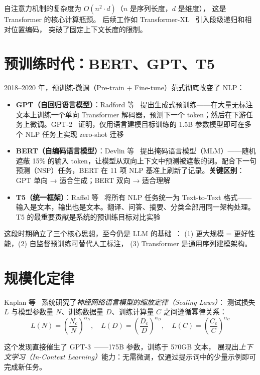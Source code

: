\documentclass[10pt, openany]{book}
\begin{document}
自注意力机制的复杂度为 \(O(n^2 \cdot d)\)（\(n\) 是序列长度，\(d\) 是维度），
这是 Transformer 的核心计算瓶颈。
后续工作如 Transformer-XL~\cite{Dai2019TransformerXL} 引入段级递归和相对位置编码，
突破了固定上下文长度的限制。

\section{预训练时代：BERT、GPT、T5}

2018--2020 年，预训练-微调（Pre-train + Fine-tune）范式彻底改变了 NLP：

\begin{itemize}
    \item \textbf{GPT（自回归语言模型）}：Radford 等~\cite{Radford2018GPT} 提出生成式预训练——在大量无标注文本上训练一个单向 Transformer 解码器，预测下一个 token；然后在下游任务上微调。GPT-2~\cite{Radford2019GPT2} 证明，仅用语言建模目标训练的 1.5B 参数模型即可在多个 NLP 任务上实现 zero-shot 迁移
    \item \textbf{BERT（自编码语言模型）}：Devlin 等~\cite{Devlin2019BERT} 提出掩码语言模型（MLM）——随机遮蔽 15\% 的输入 token，让模型从双向上下文中预测被遮蔽的词。配合下一句预测（NSP）任务，BERT 在 11 项 NLP 基准上刷新了记录。\textbf{关键区别}：GPT 单向 → 适合生成；BERT 双向 → 适合理解
    \item \textbf{T5（统一框架）}：Raffel 等~\cite{Raffel2020T5} 将所有 NLP 任务统一为 Text-to-Text 格式——输入是文本，输出也是文本。翻译、问答、摘要、分类全部用同一架构处理。T5 的最重要贡献是系统的预训练目标对比实验
\end{itemize}

这段时期确立了三个核心思想，至今仍是 LLM 的基础~\cite{Brown2020LanguageModels,Devlin2019BERT,Raffel2020T5}：
(1) 更大规模 = 更好性能，(2) 自监督预训练可替代人工标注，
(3) Transformer 是通用序列建模架构。

\section{规模化定律}

Kaplan 等~\cite{Kaplan2020Scaling} 系统研究了\emph{神经网络语言模型的缩放定律（Scaling Laws）}：
测试损失 \(L\) 与模型参数量 \(N\)、训练数据量 \(D\)、训练计算量 \(C\) 之间遵循幂律关系：
\[
L(N) = \left(\frac{N_c}{N}\right)^{\alpha_N},\quad
L(D) = \left(\frac{D_c}{D}\right)^{\alpha_D},\quad
L(C) = \left(\frac{C_c}{C}\right)^{\alpha_C}
\]

这个发现直接催生了 GPT-3~\cite{Brown2020LanguageModels}——175B 参数，训练于 570GB 文本，
展现出\emph{上下文学习（In-Context Learning）}能力：无需微调，仅通过提示词中的少量示例即可完成新任务。
\end{document}
